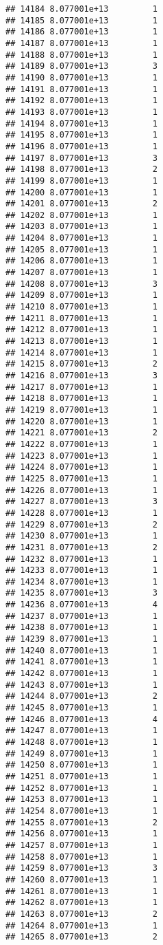 \documentclass[
]{article}
\begin{document}
\begin{verbatim}
## 14184 8.077001e+13         1
## 14185 8.077001e+13         1
## 14186 8.077001e+13         1
## 14187 8.077001e+13         1
## 14188 8.077001e+13         1
## 14189 8.077001e+13         3
## 14190 8.077001e+13         1
## 14191 8.077001e+13         1
## 14192 8.077001e+13         1
## 14193 8.077001e+13         1
## 14194 8.077001e+13         1
## 14195 8.077001e+13         1
## 14196 8.077001e+13         1
## 14197 8.077001e+13         3
## 14198 8.077001e+13         2
## 14199 8.077001e+13         1
## 14200 8.077001e+13         1
## 14201 8.077001e+13         2
## 14202 8.077001e+13         1
## 14203 8.077001e+13         1
## 14204 8.077001e+13         1
## 14205 8.077001e+13         1
## 14206 8.077001e+13         1
## 14207 8.077001e+13         1
## 14208 8.077001e+13         3
## 14209 8.077001e+13         1
## 14210 8.077001e+13         1
## 14211 8.077001e+13         1
## 14212 8.077001e+13         1
## 14213 8.077001e+13         1
## 14214 8.077001e+13         1
## 14215 8.077001e+13         2
## 14216 8.077001e+13         3
## 14217 8.077001e+13         1
## 14218 8.077001e+13         1
## 14219 8.077001e+13         1
## 14220 8.077001e+13         1
## 14221 8.077001e+13         2
## 14222 8.077001e+13         1
## 14223 8.077001e+13         1
## 14224 8.077001e+13         1
## 14225 8.077001e+13         1
## 14226 8.077001e+13         1
## 14227 8.077001e+13         3
## 14228 8.077001e+13         1
## 14229 8.077001e+13         2
## 14230 8.077001e+13         1
## 14231 8.077001e+13         2
## 14232 8.077001e+13         1
## 14233 8.077001e+13         1
## 14234 8.077001e+13         1
## 14235 8.077001e+13         3
## 14236 8.077001e+13         4
## 14237 8.077001e+13         1
## 14238 8.077001e+13         1
## 14239 8.077001e+13         1
## 14240 8.077001e+13         1
## 14241 8.077001e+13         1
## 14242 8.077001e+13         1
## 14243 8.077001e+13         1
## 14244 8.077001e+13         2
## 14245 8.077001e+13         1
## 14246 8.077001e+13         4
## 14247 8.077001e+13         1
## 14248 8.077001e+13         1
## 14249 8.077001e+13         1
## 14250 8.077001e+13         1
## 14251 8.077001e+13         1
## 14252 8.077001e+13         1
## 14253 8.077001e+13         1
## 14254 8.077001e+13         1
## 14255 8.077001e+13         2
## 14256 8.077001e+13         1
## 14257 8.077001e+13         1
## 14258 8.077001e+13         1
## 14259 8.077001e+13         3
## 14260 8.077001e+13         1
## 14261 8.077001e+13         1
## 14262 8.077001e+13         1
## 14263 8.077001e+13         2
## 14264 8.077001e+13         1
## 14265 8.077001e+13         2

\end{verbatim}
\end{document}
